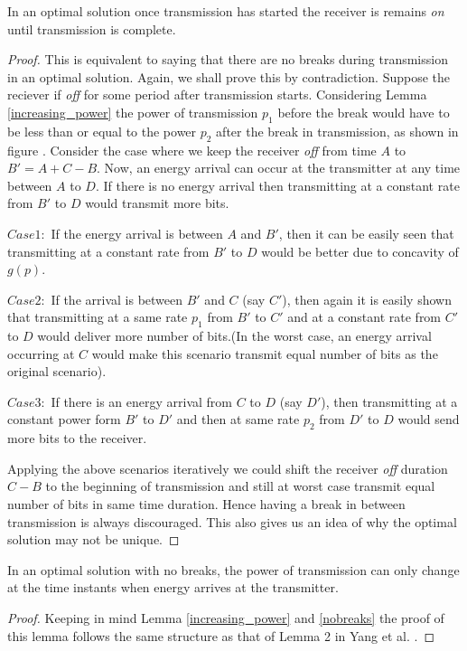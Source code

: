 \begin{lemma}
In an optimal solution once transmission has started the receiver is remains \textit{on} until transmission is complete. \label{nobreaks}
\end{lemma}
\begin{proof}
This is equivalent to saying that there are no breaks during transmission in an optimal solution. Again, we shall prove this by contradiction. Suppose the reciever if \textit{off} for some period after transmission starts. Considering Lemma \ref{increasing_power} the power of transmission $p_1$ before the break would have to be less than or equal to the power $p_2$ after the break in transmission, as shown in figure . Consider the case where we keep the receiver \textit{off} from time $A$ to $B'=A+C-B$. Now, an energy arrival can occur at the transmitter at any time between $A$ to $D$. If there is no energy arrival then transmitting at a constant rate from $B'$ to $D$ would transmit more bits.

$Case 1:$ If the energy arrival is between $A$ and $B'$, then it can be easily seen that transmitting at a constant rate from $B'$ to $D$ would be better due to concavity of $g(p)$.

$Case 2:$ If the arrival is between $B'$ and $C$ (say $C'$), then again it is easily shown that transmitting at a same rate $p_1$ from $B'$ to $C'$ and  at a constant rate from $C'$ to $D$ would deliver more number of bits.(In the worst case, an energy arrival occurring at $C$ would make this scenario transmit equal number of bits as the original scenario).

$Case 3:$ If there is an energy arrival from $C$ to $D$ (say $D'$), then transmitting at a constant power form $B'$ to $D'$ and then at same rate $p_2$ from $D'$ to $D$ would send more bits to the receiver.

Applying the above scenarios iteratively we could shift the receiver \textit{off} duration $C-B$ to the beginning of transmission and still at worst case transmit equal number of bits in same time duration. Hence having a break in between transmission is always discouraged. This also gives us an idea of why the optimal solution may not be unique.
\end{proof}

\begin{lemma}
In an optimal solution with no breaks, the power of transmission can only change at the time instants when energy arrives at the transmitter. 
\end{lemma}
\begin{proof}
Keeping in mind Lemma \ref{increasing_power} and \ref{nobreaks} the proof of this lemma follows the same structure as that of Lemma 2 in Yang et al. \cite{Yang}. 
\end{proof}	
